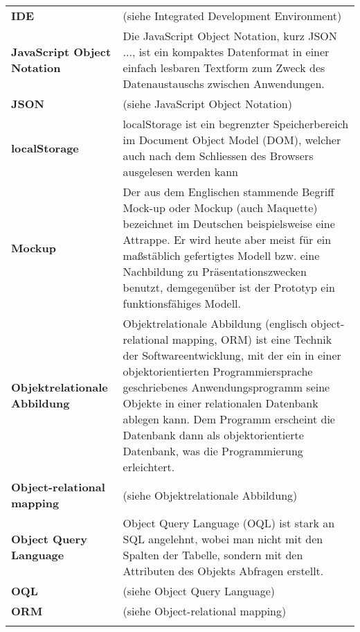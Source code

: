 \begin{longtable}{>{\raggedright}m{3cm}m{11cm}}
	\textbf{IDE}&
	(siehe Integrated Development Environment)\\ \addlinespace

	\textbf{JavaScript Object Notation}&
	Die JavaScript Object Notation, kurz JSON ..., ist ein kompaktes Datenformat in einer einfach lesbaren Textform zum Zweck des Datenaustauschs zwischen Anwendungen.\cite{wiki_json}\\ \addlinespace

	\textbf{JSON}&
	(siehe JavaScript Object Notation)\\ \addlinespace

	\textbf{localStorage}&
	localStorage ist ein begrenzter Speicherbereich im Document Object Model (DOM), welcher auch nach dem Schliessen des Browsers ausgelesen werden kann\\ \addlinespace	

	\textbf{Mockup}&
	Der aus dem Englischen stammende Begriff Mock-up oder Mockup (auch Maquette) bezeichnet im Deutschen beispielsweise eine Attrappe. Er wird heute aber meist für ein maßstäblich gefertigtes Modell bzw. eine Nachbildung zu Präsentationszwecken benutzt, demgegenüber ist der Prototyp ein funktionsfähiges Modell.\cite{wiki_mockup}\\ \addlinespace	

	\textbf{Objektrelationale Abbildung}&
	Objektrelationale Abbildung (englisch object-relational mapping, ORM) ist eine Technik der Softwareentwicklung, mit der ein in einer objektorientierten Programmiersprache geschriebenes Anwendungsprogramm seine Objekte in einer relationalen Datenbank ablegen kann. Dem Programm erscheint die Datenbank dann als objektorientierte Datenbank, was die Programmierung erleichtert. \cite{wiki_orm}\\ \addlinespace	

	\textbf{Object-relational mapping}&
	(siehe Objektrelationale Abbildung)\\ \addlinespace	

	\textbf{Object Query Language}&
	Object Query Language (OQL) ist stark an SQL angelehnt, wobei man nicht mit den Spalten der Tabelle, sondern mit den Attributen des Objekts Abfragen erstellt.\\ \addlinespace	

	\textbf{OQL}&
	(siehe Object Query Language)\\ \addlinespace

	\textbf{ORM}&
	(siehe Object-relational mapping)\\ \addlinespace


\end{longtable}
